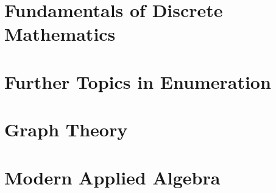 \documentclass[table]{book}
\author{Joseph M. Diza}
\theoremstyle{definition}
\begin{document}
\thispagestyle{empty} %

\thispagestyle{plain} %
\tableofcontents
\cleardoublepage

\part{Fundamentals of Discrete Mathematics}


\part{Further Topics in Enumeration}
\part{Graph Theory}
\part{Modern Applied Algebra}
\end{document}
